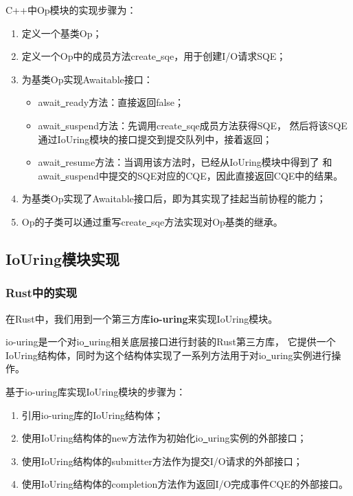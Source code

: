 \documentclass[supercite]{HustGraduPaper}
\theoremstyle{definition}
\begin{document}
C++中Op模块的实现步骤为：

\begin{enumerate}
  \item 定义一个基类Op；
  \item 定义一个Op中的成员方法create\underline{~}sqe，用于创建I/O请求SQE；
  \item 为基类Op实现Awaitable接口：
    \begin{itemize}
      \item await\underline{~}ready方法：直接返回false；
      \item await\underline{~}suspend方法：先调用create\underline{~}sqe成员方法获得SQE，
        然后将该SQE通过IoUring模块的接口提交到提交队列中，接着返回；
      \item await\underline{~}resume方法：当调用该方法时，已经从IoUring模块中得到了
        和await\underline{~}suspend中提交的SQE对应的CQE，因此直接返回CQE中的结果。
    \end{itemize}
  \item 为基类Op实现了Awaitable接口后，即为其实现了挂起当前协程的能力；
  \item Op的子类可以通过重写create\underline{~}sqe方法实现对Op基类的继承。
\end{enumerate}

\subsection{IoUring模块实现}

\subsubsection{Rust中的实现}

在Rust中，我们用到一个第三方库\textbf{io-uring}来实现IoUring模块。\par

io-uring是一个对io\underline{~}uring相关底层接口进行封装的Rust第三方库，
它提供一个IoUring结构体，同时为这个结构体实现了一系列方法用于对io\underline{~}uring实例进行操作。\par

基于io-uring库实现IoUring模块的步骤为：

\begin{enumerate}
  \item 引用io-uring库的IoUring结构体；
  \item 使用IoUring结构体的new方法作为初始化io\underline{~}uring实例的外部接口；
  \item 使用IoUring结构体的submitter方法作为提交I/O请求的外部接口；
  \item 使用IoUring结构体的completion方法作为返回I/O完成事件CQE的外部接口。
\end{enumerate}
\end{document}
